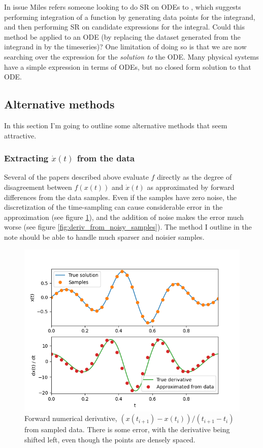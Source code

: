 \documentclass{article}
\begin{document}
In issue \cite{pysrissue732} Miles refers someone looking to do SR on ODEs to \cite{pysrchangenotev1.3.0}, which suggests performing integration of a function by generating data points for the integrand, and then performing SR on candidate expressions for the integral.
Could this method be applied to an ODE (by replacing the dataset generated from the integrand in \cite{pysrchangenotev1.3.0} by the timeseries)?
One limitation of doing so is that we are now searching over the expression for the \emph{solution to} the ODE.
Many physical systems have a simple expression in terms of ODEs, but no closed form solution to that ODE.

\subsection{Alternative methods}

In this section I'm going to outline some alternative methods that seem attractive.

\subsubsection{Extracting $\dot{x}(t)$ from the data}
\label{sec:alternate_extracting_xdot}

Several of the papers described above evaluate $f$ directly as the degree of disagreement between $f(x(t))$ and $\dot{x}(t)$ as approximated by forward differences from the data samples.
Even if the samples have zero noise, the discretization of the time-sampling can cause considerable error in the approximation (see figure \ref{fig:deriv_from_samples}), and the addition of noise makes the error much worse (see figure \ref{fig:deriv_from_noisy_samples}).
The method I outline in the note should be able to handle much sparser and noisier samples.

\begin{figure}
\includegraphics{images/alternative_methods/deriv_from_samples.png}
\centering
\caption{Forward numerical derivative, $\left(x(t_{i+1}) - x(t_i)\right)/\left(t_{i+1} - t_i\right)$ from sampled data. There is some error, with the derivative being shifted left, even though the points are densely spaced.}
\label{fig:deriv_from_samples}
\end{figure}
\end{document}
